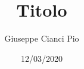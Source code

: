 \documentclass[
fontsize=11pt, %
twoside=true, %
numbers=noenddot, %
]{kao/kaobook}
\begin{document}
\title[Titolo]{Titolo}
\author[Giuseppe Cianci]{Giuseppe Cianci Pio}
\date{12/03/2020}	
	
\frontmatter %





\begingroup %

\setlength{\textheight}{23cm} %

\etocstandarddisplaystyle %
\etocstandardlines %

\tableofcontents %


\let\cleardoublepage\bigskip
\let\clearpage\bigskip

\end{document}
